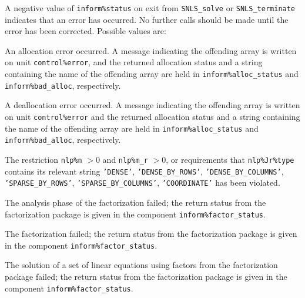\documentclass{galahad}
\newcommand{\packagename}{SNLS}
\begin{document}

\galerrors
A negative value of {\tt inform\%status} on exit from
{\tt \packagename\_solve}
or
{\tt \packagename\_terminate}
indicates that an error has occurred. No further calls should be made
until the error has been corrected. Possible values are:

\begin{description}

 An allocation error occurred.
A message indicating the offending
array is written on unit {\tt control\%error}, and the returned allocation
status and a string containing the name of the offending array
are held in {\tt inform\%alloc\_\-status}
and {\tt inform\%bad\_alloc}, respectively.

 A deallocation error occurred.
A message indicating the offending
array is written on unit {\tt control\%error} and the returned allocation
status and a string containing the name of the offending array
are held in {\tt inform\%alloc\_\-status}
and {\tt inform\%bad\_alloc}, respectively.

  The restriction {\tt nlp\%n} $> 0$ and {\tt nlp\%m\_r} $> 0$,
  or requirements that
  {\tt nlp\%Jr\%type}  contains its relevant string
  \mbox{\tt 'DENSE'}, 
  \mbox{\tt 'DENSE\_BY\_ROWS'}, 
  \mbox{\tt 'DENSE\_BY\_COLUMNS'}, 
  \mbox{\tt 'SPARSE\_BY\_ROWS'}, 
  \mbox{\tt 'SPARSE\_BY\_COLUMNS'}, 
  \mbox{\tt 'COORDINATE'} 
  has been violated.



 The analysis phase of the factorization failed;
 the return status from the factorization
    package is given in the component {\tt inform\%fac\-t\-or\_status}.

 The factorization failed;
 the return status from the factorization
    package is given in the component {\tt inform\%fac\-t\-or\_status}.

 The solution of a set of linear equations
 using factors from the factorization package failed;
 the return status from the factorization
    package is given in the component {\tt inform\%fac\-t\-or\_status}.


\end{description}
\end{document}
